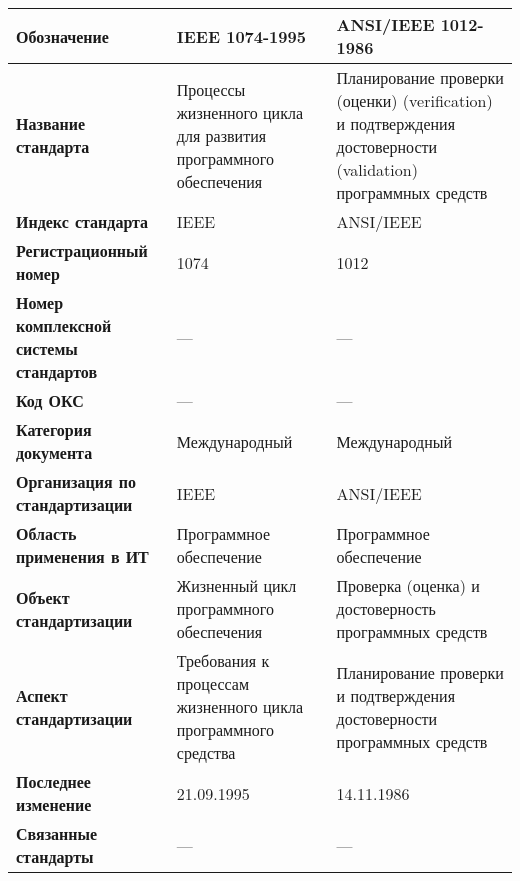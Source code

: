 \begin{table}[h!tp]
	\centering
	\caption{}
	\label{table:international}
	\begin{tabular}{|p{10em}|p{12em}|p{12em}|}
		\hline
		\textbf{Обозначение}
			& \textbf{IEEE 1074-1995} & \textbf{ANSI/IEEE 1012-1986} \\ \hline
		\textbf{Название стандарта}
				& Процессы жизненного цикла для развития программного обеспечения
				& Планирование проверки (оценки) (verification)
				и подтверждения достоверности (validation) программных средств \\ \hline
		\textbf{Индекс стандарта}
			& IEEE & ANSI/IEEE \\ \hline
		\textbf{Регистрационный номер}
			& 1074 & 1012 \\ \hline
		\textbf{Номер комплексной системы стандартов}
			& --- & --- \\ \hline
		\textbf{Код ОКС}
			& --- & --- \\ \hline
		\textbf{Категория документа}
			& Международный & Международный \\ \hline
		\textbf{Организация по стандартизации}
			& IEEE & ANSI/IEEE \\ \hline
		\textbf{Область применения в ИТ}
			& Программное обеспечение & Программное обеспечение \\ \hline
		\textbf{Объект стандартизации}
			& Жизненный цикл программного обеспечения
			& Проверка (оценка) и достоверность программных средств \\ \hline
		\textbf{Аспект стандартизации}
			& Требования к процессам жизненного цикла программного средства
			& Планирование проверки и подтверждения достоверности программных средств \\ \hline
		\textbf{Последнее изменение} & 21.09.1995 & 14.11.1986 \\ \hline
		\textbf{Связанные стандарты} & --- & --- \\ \hline
	\end{tabular}
\end{table}

